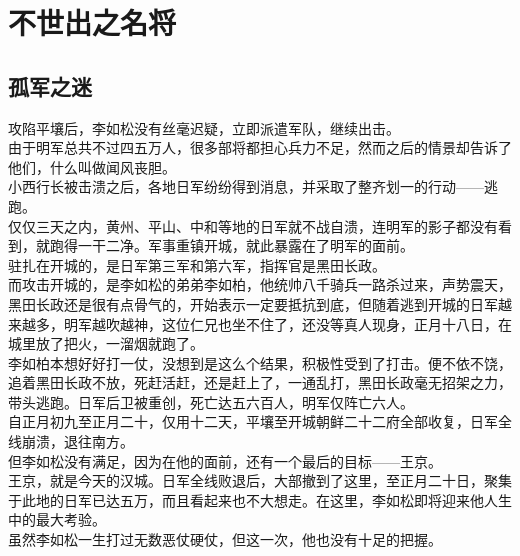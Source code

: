 \section{不世出之名将}
\ifnum{}
	\begin{multicols}{\theparacolNo}
\fi
\subsection{孤军之迷}
攻陷平壤后，李如松没有丝毫迟疑，立即派遣军队，继续出击。\\

由于明军总共不过四五万人，很多部将都担心兵力不足，然而之后的情景却告诉了他们，什么叫做闻风丧胆。\\

小西行长被击溃之后，各地日军纷纷得到消息，并采取了整齐划一的行动——逃跑。\\

仅仅三天之内，黄州、平山、中和等地的日军就不战自溃，连明军的影子都没有看到，就跑得一干二净。军事重镇开城，就此暴露在了明军的面前。\\

驻扎在开城的，是日军第三军和第六军，指挥官是黑田长政。\\

而攻击开城的，是李如松的弟弟李如柏，他统帅八千骑兵一路杀过来，声势震天，黑田长政还是很有点骨气的，开始表示一定要抵抗到底，但随着逃到开城的日军越来越多，明军越吹越神，这位仁兄也坐不住了，还没等真人现身，正月十八日，在城里放了把火，一溜烟就跑了。\\

李如柏本想好好打一仗，没想到是这么个结果，积极性受到了打击。便不依不饶，追着黑田长政不放，死赶活赶，还是赶上了，一通乱打，黑田长政毫无招架之力，带头逃跑。日军后卫被重创，死亡达五六百人，明军仅阵亡六人。\\

自正月初九至正月二十，仅用十二天，平壤至开城朝鲜二十二府全部收复，日军全线崩溃，退往南方。\\

但李如松没有满足，因为在他的面前，还有一个最后的目标——王京。\\

王京，就是今天的汉城。日军全线败退后，大部撤到了这里，至正月二十日，聚集于此地的日军已达五万，而且看起来也不大想走。在这里，李如松即将迎来他人生中的最大考验。\\

虽然李如松一生打过无数恶仗硬仗，但这一次，他也没有十足的把握。\\


\end{multicols}
